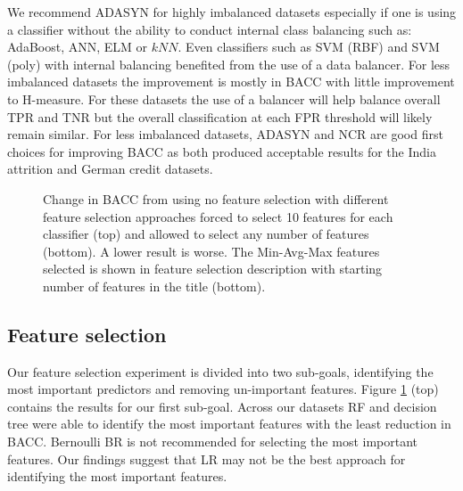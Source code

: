 \documentclass{sig-alternate-05-2015}
\begin{document}
	We recommend ADASYN for highly imbalanced datasets especially if one is using a classifier without the ability to conduct internal class balancing such as: AdaBoost, ANN, ELM or $kNN$. Even classifiers such as SVM (RBF) and SVM (poly) with internal balancing benefited from the use of a data balancer. For less imbalanced datasets the improvement is mostly in BACC with little improvement to H-measure. For these datasets the use of a balancer will help balance overall TPR and TNR but the overall classification at each FPR threshold will likely remain similar. For less imbalanced datasets, ADASYN and NCR are good first choices for improving BACC as both produced acceptable results for the India attrition and German credit datasets. 
	
	\begin{figure}
		\vspace{-5em}
		\centering
		\caption{Change in BACC from using no feature selection with different feature selection approaches forced to select 10 features for each classifier (top) and allowed to select any number of features (bottom). A lower result is worse. The Min-Avg-Max features selected is shown in feature selection description with starting number of features in the title (bottom). }
		\label{fig:feature_selection_limit_15}
		\vspace{-0em}
	\end{figure}
	
	
	\subsection{Feature selection}
	Our feature selection experiment is divided into two sub-goals, identifying the most important predictors and removing un-important features. Figure \ref{fig:feature_selection_limit_15} (top) contains the results for our first sub-goal. Across our datasets RF and decision tree were able to identify the most important features with the least reduction in BACC. Bernoulli BR is not recommended for selecting the most important features. Our findings suggest that LR may not be the best approach for identifying the most important features.
	
\end{document}

